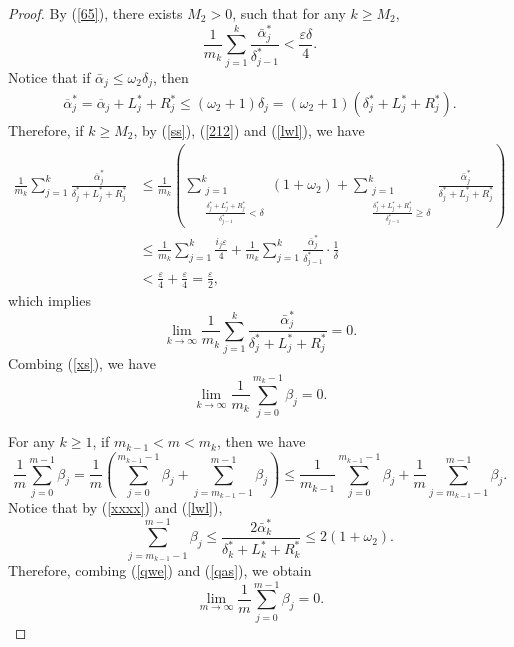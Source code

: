 \documentclass[reqno]{amsart}
\theoremstyle{plain}
\theoremstyle{definition}
\theoremstyle{remark}
\numberwithin{equation}{section} \DeclareMathOperator\intr{int}
\begin{document}
\begin{proof}
By (\ref{65}), there exists $M_2>0$, such that for any $k\ge M_2$,
\begin{equation}\label{212}
\frac{1}{m_k} \sum_{j = 1}^{k}\frac{\bar{\alpha}^*_j}{\delta^*_{j-1}}<\frac{\varepsilon \delta}{4}.
\end{equation}
Notice that if $\bar{\alpha}_j\le \omega_2 \delta_j$, then
 \begin{align}\label{lwl}
\overline{\alpha } _{j}^{*}=\overline{\alpha}_j+L^*_j+R^*_j\le (\omega_2+1)\delta_j=(\omega_2+1)(\delta^*_{j}+L^*_j+R^*_j).
\end{align}
Therefore, if $k\ge M_2$, by (\ref{ss}),  (\ref{212}) and  (\ref{lwl}), we have
\begin{equation*}
\begin{aligned}
\frac{1}{m_k} \sum_{j = 1}^{k}\frac{\bar{\alpha}^*_j}{\delta^*_{j}+L^*_j+R^*_j}&\le \frac{1}{m_k}(\sum_{\substack{j=1\\\frac{\delta^*_j+L^*_j+R^*_j}{\delta^*_{j-1}}<\delta}}^{k}(1+\omega_2)+\sum_{\substack{j=1\\\frac{\delta^*_j+L^*_j+R^*_j}{\delta^*_{j-1}}\ge\delta}}^{k}\frac{\bar{\alpha}^*_j}{\delta^*_{j}+L^*_j+R^*_j} )\\
&\le \frac{1}{m_k}\sum_{j = 1}^{k}\frac{i_j\varepsilon }{4}+\frac{1}{m_k}\sum_{j = 1}^{k}\frac{\bar{\alpha}^*_j}{\delta^*_{j-1}}\cdot \frac{1}{\delta}\\
&<\frac{\varepsilon }{4}+\frac{\varepsilon }{4}=\frac{\varepsilon}{2},
\end{aligned}
\end{equation*}
which implies  $$\lim_{k \to \infty} \frac{1}{m_k} \sum_{j = 1}^{k}\frac{\bar{\alpha}^*_j}{\delta^*_{j}+L^*_j+R^*_j}=0.$$
Combing (\ref{xs}), we have
\begin{equation}\label{qwe}
\lim_{k \to \infty}\frac{1}{m_k} \sum_{j=0}^{m_k-1} \beta_{j}=0.
\end{equation}

For any  $k\ge 1$, if  $m_{k-1}<m<m_k$, then we have
\begin{equation}
\frac{1}{m} \sum_{j=0}^{m-1} \beta_{j}=\frac{1}{m} (\sum_{j=0}^{m_{k-1}-1} \beta_{j}+\sum_{j=m_{k-1}-1}^{m-1} \beta_{j})\le \frac{1}{m_{k-1}} \sum_{j=0}^{m_{k-1}-1} \beta_{j}+\frac{1}{m}\sum_{j=m_{k-1}-1}^{m-1}\beta_{j}.
\end{equation}
Notice that by (\ref{xxxx}) and (\ref{lwl}),
\begin{equation}\label{qas}
\sum_{j=m_{k-1}-1}^{m-1}\beta_{j}\le\frac{2\bar{\alpha}^*_k}{\delta^*_k+L^*_k+R^*_k}\le 2(1+\omega_2).
\end{equation}
Therefore, combing (\ref{qwe}) and (\ref{qas}), we obtain
\begin{equation*}
\lim_{m \to \infty} \frac{1}{m} \sum_{j=0}^{m-1} \beta_{j}=0.
\end{equation*}


\end{proof}
\end{document}
